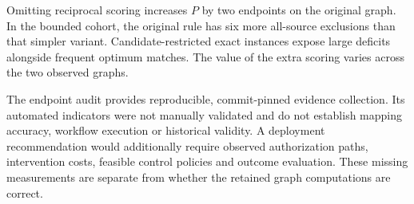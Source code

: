 Omitting reciprocal scoring increases $P$ by two endpoints on the original graph. In the bounded cohort, the original rule has six more all-source exclusions than that simpler variant. Candidate-restricted exact instances expose large deficits alongside frequent optimum matches. The value of the extra scoring varies across the two observed graphs.

The endpoint audit provides reproducible, commit-pinned evidence collection. Its automated indicators were not manually validated and do not establish mapping accuracy, workflow execution or historical validity. A deployment recommendation would additionally require observed authorization paths, intervention costs, feasible control policies and outcome evaluation. These missing measurements are separate from whether the retained graph computations are correct.
